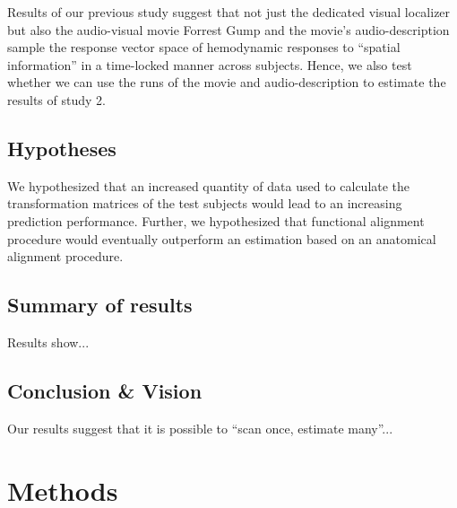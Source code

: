 
%
Results of our previous study \citep{haeusler2022processing} suggest that not
just the dedicated visual localizer \citep{sengupta2016extension} but also the
audio-visual movie Forrest Gump \citep{hanke2016simultaneous} and the movie's
audio-description \citep{hanke2014audiomovie} sample the response vector space
of hemodynamic responses to ``spatial information'' in a time-locked manner
across subjects.
%
Hence, we also test whether we can use the runs of the movie and
audio-description to estimate the results of study 2.


\subsection{Hypotheses}



%
We hypothesized that an increased quantity of data used to calculate the
transformation matrices of the test subjects would lead to an increasing
prediction performance.
%
Further, we hypothesized that functional alignment procedure would eventually
outperform an estimation based on an anatomical alignment procedure.


\subsection{Summary of results}


%
Results show...


\subsection{Conclusion \& Vision}


Our results suggest that it is possible to ``scan once, estimate many''...



\section{Methods}

